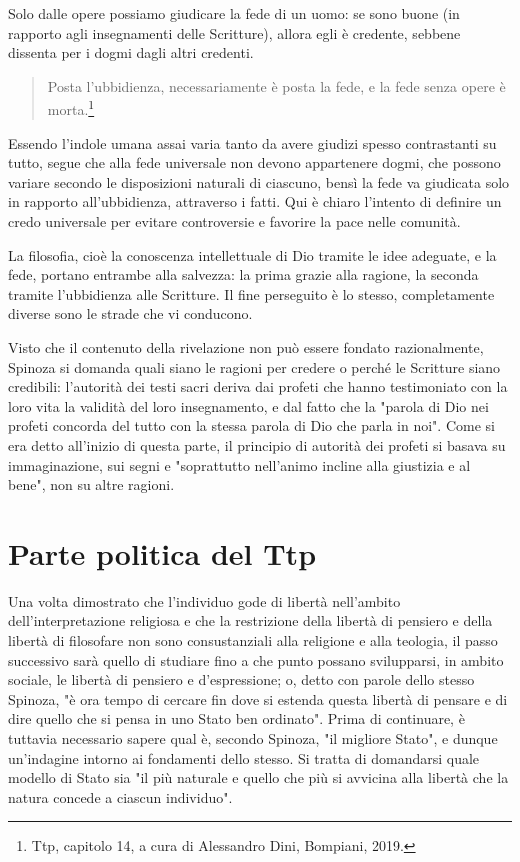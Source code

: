 Solo dalle opere possiamo giudicare la fede di un uomo: se sono buone (in rapporto agli insegnamenti delle Scritture), allora egli è credente, sebbene dissenta per i dogmi dagli altri credenti.

\begin{quotation}
	\small Posta l'ubbidienza, necessariamente è posta la fede, e la fede senza opere è morta.\footnote{Ttp, capitolo 14, a cura di Alessandro Dini, Bompiani, 2019.}
\end{quotation}

Essendo l'indole umana assai varia tanto da avere giudizi spesso contrastanti su tutto, segue che alla fede universale non devono appartenere dogmi, che possono variare secondo le disposizioni naturali di ciascuno, bensì la fede va giudicata solo in rapporto all'ubbidienza, attraverso i fatti. Qui è chiaro l'intento di definire un credo universale per evitare controversie e favorire la pace nelle comunità.

La filosofia, cioè la conoscenza intellettuale di Dio tramite le idee adeguate, e la fede, portano entrambe alla salvezza: la prima grazie alla ragione, la seconda tramite l'ubbidienza alle Scritture. Il fine perseguito è lo stesso, completamente diverse sono le strade che vi conducono.

Visto che il contenuto della rivelazione non può essere fondato razionalmente, Spinoza si domanda quali siano le ragioni per credere  o perché le Scritture siano credibili: l'autorità dei testi sacri deriva dai profeti che hanno testimoniato con la loro vita la validità del loro insegnamento, e dal fatto che la "parola di Dio nei profeti concorda del tutto con la stessa parola di Dio che parla in noi".
Come si era detto all'inizio di questa parte, il principio di autorità dei profeti si basava su immaginazione, sui segni e "soprattutto nell'animo incline alla giustizia e al bene", non su altre ragioni.

\section[Parte politica]{Parte politica del Ttp}

Una volta dimostrato che l’individuo gode di libertà nell’ambito dell’interpretazione religiosa e che la restrizione della libertà di pensiero e della libertà
di filosofare non sono consustanziali alla religione e alla teologia, il passo successivo sarà quello di studiare fino a che punto possano svilupparsi, in ambito
sociale, le libertà di pensiero e d’espressione; o, detto con parole dello stesso
Spinoza, "è ora tempo di cercare fin dove si estenda questa libertà di pensare
e di dire quello che si pensa in uno Stato ben ordinato". Prima di continuare, è tuttavia necessario sapere qual è, secondo Spinoza, "il migliore Stato", e
dunque un’indagine intorno ai fondamenti dello stesso. Si tratta di domandarsi
quale modello di Stato sia "il più naturale e quello che più si avvicina alla libertà che la natura concede a ciascun individuo".












\newpage